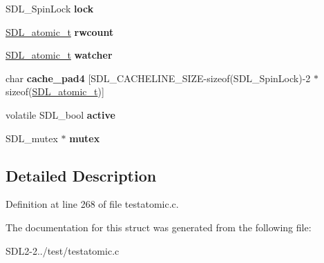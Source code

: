 \begin{DoxyCompactItemize}
\item 
\hypertarget{structSDL__EventQueue_adedb6ecc98ef5bb80489914ab4950f32}{S\+D\+L\+\_\+\+Spin\+Lock {\bfseries lock}}\label{structSDL__EventQueue_adedb6ecc98ef5bb80489914ab4950f32}

\item 
\hypertarget{structSDL__EventQueue_a659e0a8e56f33dbe1e120a38e7b4ea48}{\hyperlink{structSDL__atomic__t}{S\+D\+L\+\_\+atomic\+\_\+t} {\bfseries rwcount}}\label{structSDL__EventQueue_a659e0a8e56f33dbe1e120a38e7b4ea48}

\item 
\hypertarget{structSDL__EventQueue_a40437a4c5ee9ca1a2e8b62edd4fae391}{\hyperlink{structSDL__atomic__t}{S\+D\+L\+\_\+atomic\+\_\+t} {\bfseries watcher}}\label{structSDL__EventQueue_a40437a4c5ee9ca1a2e8b62edd4fae391}

\item 
\hypertarget{structSDL__EventQueue_ae6e9b8efd398b956b58719592ed1b5eb}{char {\bfseries cache\+\_\+pad4} \mbox{[}S\+D\+L\+\_\+\+C\+A\+C\+H\+E\+L\+I\+N\+E\+\_\+\+S\+I\+Z\+E-\/sizeof(S\+D\+L\+\_\+\+Spin\+Lock)-\/2 $\ast$sizeof(\hyperlink{structSDL__atomic__t}{S\+D\+L\+\_\+atomic\+\_\+t})\mbox{]}}\label{structSDL__EventQueue_ae6e9b8efd398b956b58719592ed1b5eb}

\item 
\hypertarget{structSDL__EventQueue_a4f307e74316a087224cb14772bc92a9f}{volatile S\+D\+L\+\_\+bool {\bfseries active}}\label{structSDL__EventQueue_a4f307e74316a087224cb14772bc92a9f}

\item 
\hypertarget{structSDL__EventQueue_a3e5678a0ca768db940fedce03293fe04}{S\+D\+L\+\_\+mutex $\ast$ {\bfseries mutex}}\label{structSDL__EventQueue_a3e5678a0ca768db940fedce03293fe04}

\end{DoxyCompactItemize}


\subsection{Detailed Description}


Definition at line 268 of file testatomic.\+c.



The documentation for this struct was generated from the following file\+:\begin{DoxyCompactItemize}
\item 
S\+D\+L2-\/2../test/testatomic.\+c\end{DoxyCompactItemize}
